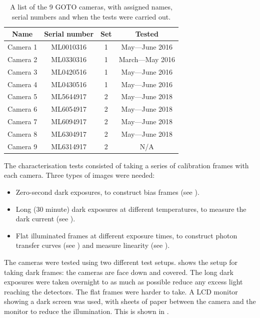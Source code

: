 \begin{colsection}
\begin{colsection}
\begin{table}[t]
    \begin{center}
        \begin{tabular}{cccc} %
            Name     & Serial number & Set & Tested \\
            \midrule
            Camera 1 & ML0010316     &   1 & May---June 2016  \\
            Camera 2 & ML0330316     &   1 & March---May 2016 \\
            Camera 3 & ML0420516     &   1 & May---June 2016  \\
            Camera 4 & ML0430516     &   1 & May---June 2016  \\
            Camera 5 & ML5644917     &   2 & May---June 2018  \\
            Camera 6 & ML6054917     &   2 & May---June 2018  \\
            Camera 7 & ML6094917     &   2 & May---June 2018  \\
            Camera 8 & ML6304917     &   2 & May---June 2018  \\
            Camera 9 & ML6314917     &   2 & N/A              \\
        \end{tabular}
    \end{center}
    \caption[List of GOTO cameras]{
        A list of the 9 GOTO cameras, with assigned names, serial numbers and when the tests were carried out.
        }\label{tab:cameras}
\end{table}

The characterisation tests consisted of taking a series of calibration frames with each camera. Three types of images were needed:

\begin{itemize}
    \item Zero-second dark exposures, to construct bias frames (see ).
    \item Long (30 minute) dark exposures at different temperatures, to measure the dark current (see ).
    \item Flat illuminated frames at different exposure times, to construct photon transfer curves (see ) and measure linearity (see ).
\end{itemize}

The cameras were tested using two different test setups.  shows the setup for taking dark frames: the cameras are face down and covered. The long dark exposures were taken overnight to as much as possible reduce any excess light reaching the detectors. The flat frames were harder to take. A LCD monitor showing a dark screen was used, with sheets of paper between the camera and the monitor to reduce the illumination. This is shown in .


\end{colsection}
\end{colsection}
